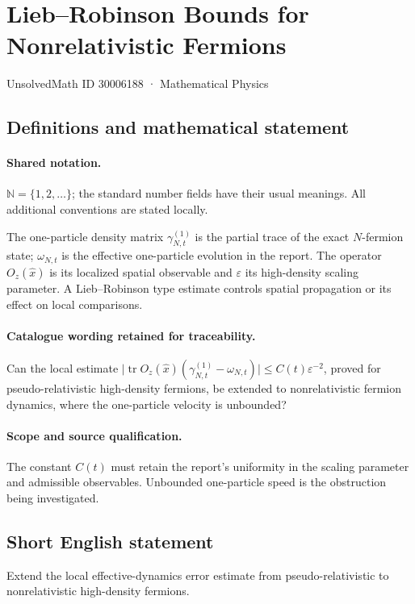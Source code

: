 \documentclass[11pt]{article}
\begin{document}
\setcounter{section}{30006187}
\section{Lieb–Robinson Bounds for Nonrelativistic Fermions}\label{30006188}
{\small UnsolvedMath ID 30006188 · Mathematical Physics}
\subsection{Definitions and mathematical statement}

\paragraph{Shared notation.}$\mathbb N=\{1,2,\ldots\}$; the standard number fields have their usual meanings. All additional conventions are stated locally.


The one-particle density matrix $\gamma^{(1)}_{N,t}$ is the partial trace of the exact $N$-fermion state; $\omega_{N,t}$ is the effective one-particle evolution in the report. The operator $O_z(\widehat x)$ is its localized spatial observable and $\varepsilon$ its high-density scaling parameter. A Lieb--Robinson type estimate controls spatial propagation or its effect on local comparisons.

\paragraph{Catalogue wording retained for traceability.}
Can the local estimate $\lvert\operatorname{tr} O_z(\widehat{x})(\gamma^{(1)}_{N,t}-\omega_{N,t})\rvert\leq C(t)\varepsilon^{-2}$, proved for pseudo-relativistic high-density fermions, be extended to nonrelativistic fermion dynamics, where the one-particle velocity is unbounded?

\paragraph{Scope and source qualification.}The constant $C(t)$ must retain the report's uniformity in the scaling parameter and admissible observables. Unbounded one-particle speed is the obstruction being investigated.
\subsection{Short English statement}
Extend the local effective-dynamics error estimate from pseudo-relativistic to nonrelativistic high-density fermions.
\end{document}
